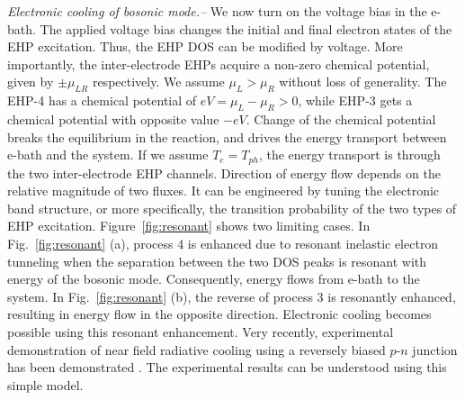 \documentclass[aps
,twocolumn
,floatfix,footinbib,prl
]{revtex4-1}
\begin{document}
\emph{Electronic cooling of bosonic mode.--}
We now turn on the voltage bias in the e-bath.
The applied voltage bias changes the initial and final electron states of the EHP excitation. Thus, the EHP DOS can be modified by voltage. More importantly, the inter-electrode EHPs acquire a non-zero chemical potential, given by $\pm \mu_{LR}$ respectively. We assume $\mu_L>\mu_R$ without loss of generality. The EHP-4 has a chemical potential of $eV=\mu_L-\mu_R>0$, while EHP-3 gets a chemical potential with opposite value $-eV$. Change of the chemical potential breaks the equilibrium in the reaction, and drives the energy transport between e-bath and the system. If we assume $T_e=T_{ph}$, the energy transport is through the two inter-electrode EHP channels.
Direction of energy flow depends on the relative magnitude of two fluxes. It can be engineered by tuning the electronic band structure, or more specifically, the transition probability of the two types of EHP excitation. Figure~\ref{fig:resonant} shows two limiting cases. In Fig.~\ref{fig:resonant} (a), process 4 is enhanced due to resonant inelastic electron tunneling when the separation between the two DOS peaks is resonant with energy of the bosonic mode. Consequently, energy flows from e-bath to the system. In Fig.~\ref{fig:resonant} (b), the reverse of process 3 is resonantly enhanced, resulting in energy flow in the opposite direction. Electronic cooling becomes possible using this resonant enhancement. Very recently, experimental demonstration of near field radiative cooling using a reversely biased $p$-$n$ junction has been demonstrated \cite{zhu2019near}. The experimental results can be understood using this simple model.




\end{document}
